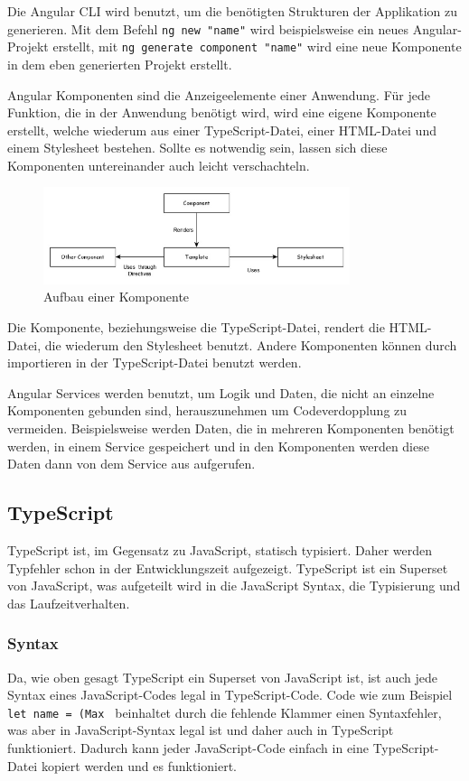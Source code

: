 Die Angular CLI wird benutzt, um die benötigten Strukturen der Applikation zu generieren. Mit dem Befehl \lstinline |ng new "name"|
wird beispielsweise ein neues Angular-Projekt erstellt, mit \lstinline |ng generate component "name"| wird eine neue Komponente in 
dem eben generierten Projekt erstellt.

Angular Komponenten sind die Anzeigeelemente einer Anwendung. Für jede Funktion, die in der Anwendung benötigt wird, wird eine
eigene Komponente erstellt, welche wiederum aus einer TypeScript-Datei, einer HTML-Datei und einem Stylesheet bestehen. 
Sollte es notwendig sein, lassen sich diese Komponenten untereinander auch leicht verschachteln. \cite{angular4}
\begin{figure}[h]
    \centering
    \includegraphics[width=0.80\textwidth]{pics/angular-component.jpg}
    \caption{Aufbau einer Komponente}
    \label{fig:aufbau_component}
\end{figure}

Die Komponente, beziehungsweise die TypeScript-Datei, rendert die HTML-Datei, die wiederum den Stylesheet benutzt. Andere 
Komponenten können durch importieren in der TypeScript-Datei benutzt werden.


Angular Services werden benutzt, um Logik und Daten, die nicht an einzelne Komponenten gebunden sind, herauszunehmen um 
Codeverdopplung zu vermeiden. Beispielsweise werden Daten, die in mehreren Komponenten benötigt werden, in einem Service 
gespeichert und in den Komponenten werden diese Daten dann von dem Service aus aufgerufen.
\cite{angular3}


\subsection{TypeScript} \label{typescript}
TypeScript ist, im Gegensatz zu JavaScript, statisch typisiert. Daher werden Typfehler schon in der Entwicklungszeit aufgezeigt.
TypeScript ist ein Superset von JavaScript, was aufgeteilt wird in die JavaScript Syntax, die Typisierung und das Laufzeitverhalten.

\subsubsection{Syntax}
Da, wie oben gesagt TypeScript ein Superset von JavaScript ist, ist auch jede Syntax eines JavaScript-Codes legal in 
TypeScript-Code. Code wie zum Beispiel \lstinline |let name = (Max | beinhaltet durch die fehlende Klammer einen Syntaxfehler, was aber
in JavaScript-Syntax legal ist und daher auch in TypeScript funktioniert. Dadurch kann jeder JavaScript-Code einfach in eine
TypeScript-Datei kopiert werden und es funktioniert.

